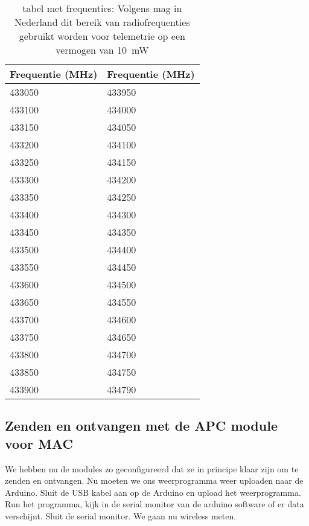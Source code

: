 \begin{center}
\begin{table}
    \begin{tabular}{ | l | l | }
    \hline
    Frequentie (MHz) & Frequentie (MHz)  \\ \hline
    433050 & 433950     \\ \hline
    433100 & 434000     \\ \hline
    433150 & 434050     \\ \hline
    433200 & 434100     \\ \hline
    433250 & 434150     \\ \hline
    433300 & 434200     \\ \hline
    433350 & 434250     \\ \hline
    433400 & 434300     \\ \hline
    433450 & 434350     \\ \hline
    433500 & 434400     \\ \hline
    433550 & 434450     \\ \hline
    433600 & 434500     \\ \hline
    433650 & 434550     \\ \hline
    433700 & 434600     \\ \hline
    433750 & 434650     \\ \hline
    433800 & 434700     \\ \hline
    433850 & 434750     \\ \hline
    433900 & 434790     \\ \hline
   \end{tabular}
   \caption{tabel met frequenties: Volgens \cite{Radio} mag in Nederland
   dit bereik van radiofrequenties gebruikt worden voor telemetrie op
   een vermogen van \SI{10}{\milli\watt}}
   \label{table:frequenties}
\end{table}
\end{center}

\subsection{Zenden en ontvangen met de APC module voor MAC}

We hebben nu de modules zo geconfigureerd dat ze in principe klaar zijn
om te zenden en ontvangen. Nu moeten we ons weerprogramma weer uploaden
naar de Arduino. Sluit de USB kabel aan op de Arduino en upload het
weerprogramma. Run het programma, kijk in de serial monitor van de
arduino software of er data verschijnt. Sluit de serial monitor. We gaan
nu wireless meten.

